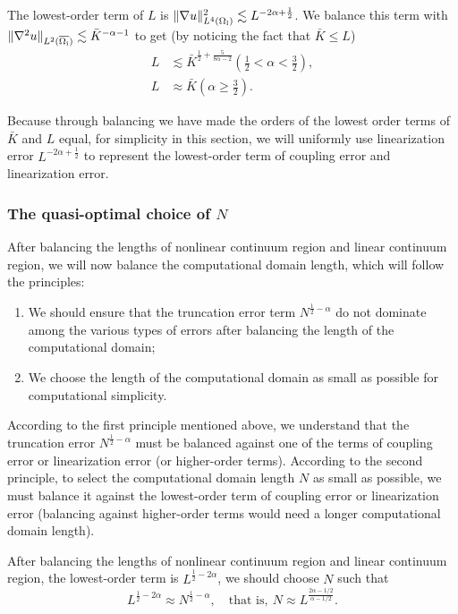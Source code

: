 The lowest-order term of $L$ is $\Vert \nabla u \Vert^{2}_{L^{4}(\Omega_{{\rm l}})} \lesssim L^{-2\alpha+\frac{1}{2}}$. We balance this term with $\Vert \nabla^{2} u\Vert_{L^{2}(\overline{\Omega_{{\rm i}}})} \lesssim \bar{K}^{-\alpha-1}$ to get (by noticing the fact that $\bar{K}\le L$)
\begin{align}
	L &\lesssim \bar{K}^{\frac{1}{2}+\frac{5}{8\alpha-2}}(\frac{1}{2}<\alpha<\frac{3}{2}) \label{Balance of L NCG 1},\\
	L &\approx \bar{K}(\alpha \ge \frac{3}{2})\label{Balance of L NCG 2}.
\end{align}

Because through balancing we have made the orders of the lowest order terms of $\bar{K}$ and $L$ equal, for simplicity in this section, we will uniformly use linearization error $L^{-2\alpha+\frac{1}{2}}$ to represent the lowest-order term of coupling error and linearization error.

\subsubsection{The quasi-optimal choice of $N$}
\label{sec: choice_of_N_ncg}

After balancing the lengths of nonlinear continuum region and linear continuum region, we will now balance the computational domain length, which will follow the principles:

\begin{enumerate}
	\item We should ensure that the truncation error term $N^{\frac{1}{2}-\alpha}$ do not dominate among the various types of errors after balancing the length of the computational domain;
	
	\item We choose the length of the computational domain as small as possible for computational simplicity.
\end{enumerate}

According to the first principle mentioned above, we understand that the truncation error $N^{\frac{1}{2}-\alpha}$ must be balanced against one of the terms of coupling error or linearization error (or higher-order terms). According to the second principle, to select the computational domain length $N$ as small as possible, we must balance it against the lowest-order term of coupling error or linearization error (balancing against higher-order terms would need a longer computational domain length).

After balancing the lengths of nonlinear continuum region and linear continuum region, the lowest-order term is $L^{\frac{1}{2}-2\alpha}$, we should choose $N$ such that
\begin{equation*}
	L^{\frac{1}{2}-2\alpha}\approx N^{\frac{1}{2}-\alpha}, \quad \text{that is}, \ N\approx L^{\frac{2\alpha-1/2}{\alpha-1/2}}.
\end{equation*}

